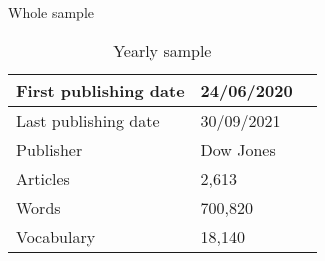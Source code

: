 \begin{table}[htbp]
    \centering
    \begin{minipage}[t]{0.45\textwidth} %
        \centering
        \caption{Whole sample}
        \begin{tabular}{l|ll}
		\toprule 
		First publishing date & 24/06/2020
		\\ \hline 
		Last publishing date & 30/09/2021
		\\ \hline 
		Publisher & Dow Jones
		\\ \hline 
		Articles & 2,613
		\\ \hline 
		Words & 700,820
		\\ \hline
		Vocabulary  & 18,140
		\\ \bottomrule
		\end{tabular}
    \end{minipage}
    \hfill %
    \begin{minipage}[t]{0.45\textwidth} %
        \centering
        \caption{Yearly sample}
        
    \end{minipage}
\end{table}





